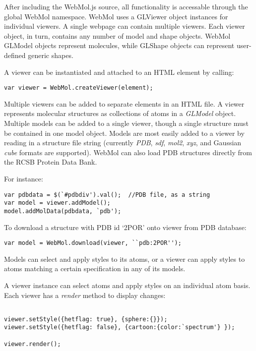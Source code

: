 \documentclass[]{article}
\begin{document}
After including the WebMol.js source, all functionality is accessable through the global WebMol namespace. WebMol uses a GLViewer object instances for individual viewers.  A single webpage can contain multiple viewers.  Each viewer object, in turn, contains any number of model and shape objects.  WebMol GLModel objects represent molecules, while GLShape objects can represent user-defined generic shapes.

A viewer can be instantiated and attached to an HTML element by calling:

\begin{verbatim}
var viewer = WebMol.createViewer(element);
\end{verbatim}

Multiple viewers can be added to separate elements in an HTML file.  A viewer represents molecular structures as collections of atoms in a \emph{GLModel} object.  Multiple models can be added to a single viewer, though a single structure must be contained in one model object.  Models are most easily added to a viewer by reading in a structure file string (currently \emph{PDB}, \emph{sdf}, \emph{mol2}, \emph{xyz}, and Gaussian \emph{cube} formats are supported).  WebMol can also load PDB structures directly from the RCSB Protein Data Bank.

For instance:

\begin{verbatim}
var pdbdata = $(`#pdbdiv').val();  //PDB file, as a string
var model = viewer.addModel();
model.addMolData(pdbdata, `pdb');
\end{verbatim}

To download a structure with PDB id `2POR' onto viewer from PDB database:

\begin{verbatim}
var model = WebMol.download(viewer, ``pdb:2POR'');
\end{verbatim}

Models can select and apply styles to its atoms, or a viewer can apply styles to atoms matching a certain specification in any of its models.

A viewer instance can select atoms and apply styles on an individual atom basis.  Each viewer has a \emph{render} method to display changes:

\begin{verbatim}

viewer.setStyle({hetflag: true}, {sphere:{}});
viewer.setStyle({hetflag: false}, {cartoon:{color:`spectrum'} });

viewer.render();
\end{verbatim}
\end{document}
